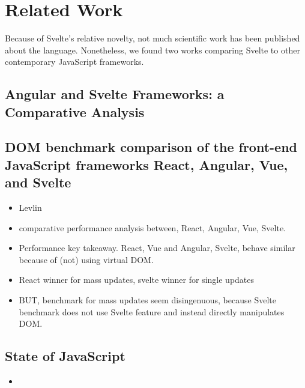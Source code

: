 \chapter{Related Work}
\label{ch:related-work}


Because of Svelte's relative novelty, not much scientific work has been published about the language. Nonetheless, we found two works comparing Svelte to other contemporary JavaScript frameworks.

\section{Angular and Svelte Frameworks: a Comparative Analysis}

\section{DOM benchmark comparison of the front-end JavaScript frameworks React, Angular, Vue, and Svelte}

\begin{itemize}
    \item Levlin\cite{levlin_dom_2020}
    \item comparative performance analysis between, React, Angular, Vue, Svelte.
    \item Performance key takeaway. React, Vue and Angular, Svelte, behave similar because of (not) using virtual DOM.
    \item React winner for mass updates, svelte winner for single updates
    \item BUT, benchmark for mass updates seem disingenuous, because Svelte benchmark does not use Svelte feature and instead directly manipulates DOM. 
\end{itemize}

\section{State of JavaScript}

\begin{itemize}
    \item \cite{noauthor_state_nodate}
\end{itemize}